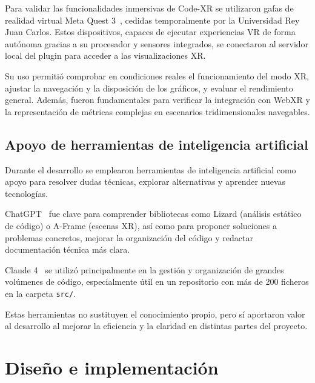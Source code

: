 \documentclass[a4paper, 12pt]{book}
\begin{document}
Para validar las funcionalidades inmersivas de Code-XR se utilizaron gafas de realidad virtual Meta Quest 3~\cite{metaquest3}, cedidas temporalmente por la Universidad Rey Juan Carlos. Estos dispositivos, capaces de ejecutar experiencias VR de forma autónoma gracias a su procesador y sensores integrados, se conectaron al servidor local del plugin para acceder a las visualizaciones XR.  

Su uso permitió comprobar en condiciones reales el funcionamiento del modo XR, ajustar la navegación y la disposición de los gráficos, y evaluar el rendimiento general. Además, fueron fundamentales para verificar la integración con WebXR y la representación de métricas complejas en escenarios tridimensionales navegables.


\section{Apoyo de herramientas de inteligencia artificial}
\label{sec:ia}

Durante el desarrollo se emplearon herramientas de inteligencia artificial como apoyo para resolver dudas técnicas, explorar alternativas y aprender nuevas tecnologías.  

ChatGPT~\cite{chatgpt} fue clave para comprender bibliotecas como Lizard (análisis estático de código) o A-Frame (escenas XR), así como para proponer soluciones a problemas concretos, mejorar la organización del código y redactar documentación técnica más clara.  

Claude 4~\cite{claude4} se utilizó principalmente en la gestión y organización de grandes volúmenes de código, especialmente útil en un repositorio con más de 200 ficheros en la carpeta \texttt{src/}.  

Estas herramientas no sustituyen el conocimiento propio, pero sí aportaron valor al desarrollo al mejorar la eficiencia y la claridad en distintas partes del proyecto.



\cleardoublepage
\chapter{Diseño e implementación}
\label{sec:diseno}
\end{document}
